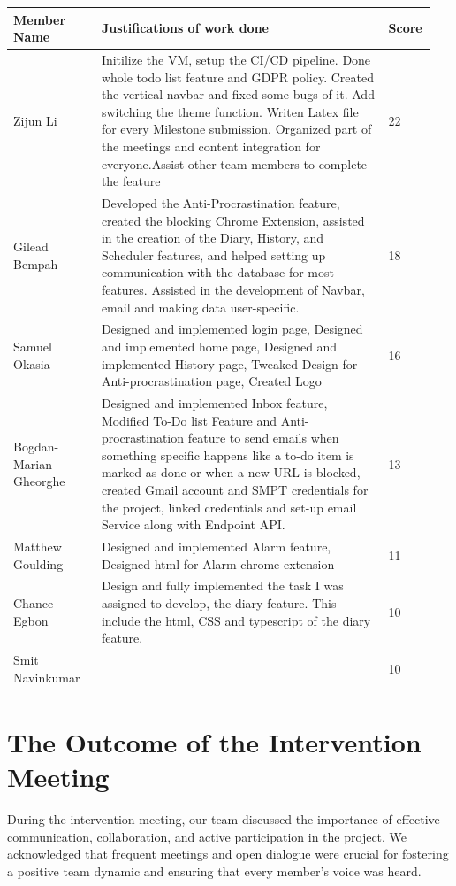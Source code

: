\documentclass[a4paper]{article}
\begin{document}
{\noindent\begin{tabular}{|p{0.2\linewidth}|p{0.65\linewidth}|p{0.1\linewidth}|} 
	\hline
 \textbf{Member Name} & \textbf{Justifications of work done} & \textbf{Score}\\
 \hline
 Zijun Li & Initilize the VM, setup the CI/CD pipeline. Done whole todo list feature and GDPR policy. Created the vertical navbar and fixed some bugs of it. Add switching the theme function. Writen Latex file for every Milestone submission. Organized part of the meetings and content integration for everyone.Assist other team members to complete the feature & 22\\
 \hline
 Gilead Bempah & Developed the Anti-Procrastination feature, created the blocking Chrome Extension, assisted in the creation of the Diary, History, and Scheduler features, and helped setting up communication with the database for most features. Assisted in the development of Navbar, email and making data user-specific.& 18\\
 \hline
 Samuel Okasia & Designed and implemented login page, Designed and implemented home page, Designed and implemented History page, Tweaked Design for Anti-procrastination page, Created Logo & 16\\
 \hline
 Bogdan-Marian Gheorghe & Designed and implemented Inbox feature, Modified To-Do list Feature and Anti-procrastination feature to send emails when something specific happens like a to-do item is marked as done or when a new URL is blocked, created Gmail account and SMPT credentials for the project, linked credentials and set-up email Service along with Endpoint API. & 13\\
 \hline
 Matthew Goulding& Designed and implemented Alarm feature, Designed html for Alarm chrome extension & 11\\
 \hline
 Chance Egbon & Design and fully implemented the task I was assigned to develop, the diary feature.  This include the html, CSS and typescript of the diary feature.& 10\\
 \hline
 Smit Navinkumar& & 10\\
 \hline
\end{tabular}}

\newpage

\section*{The Outcome of the Intervention Meeting}

During the intervention meeting, our team discussed the importance of effective communication, collaboration, and active participation in the project. We acknowledged that frequent meetings and open dialogue were crucial for fostering a positive team dynamic and ensuring that every member's voice was heard.
\end{document}
